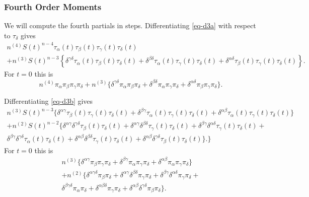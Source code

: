 \documentclass[
  12pt,
  letterpaper,
  DIV=11,
  numbers=noendperiod]{scrartcl}
\begin{document}
\subsubsection{Fourth Order Moments}\label{fourth-order-moments}

We will compute the fourth partials in steps. Differentiating
\eqref{eq-d3a} with respect to \(\tau_\delta\) gives \begin{multline}
n^{(4)}S(t)^{n-4}\tau_\alpha(t)\tau_\beta(t)\tau_\gamma(t)\tau_\delta(t)\\
+n^{(3)}S(t)^{n-3}\left\{\delta^{\gamma\delta}\tau_\alpha(t)\tau_\beta(t)\tau_\delta(t)+\delta^{\beta\delta}\tau_\alpha(t)\tau_\gamma(t)\tau_\delta(t)+\delta^{\alpha\delta}\tau_\beta(t)\tau_\gamma(t)\tau_\delta(t)\right\}.
\end{multline} For \(t=0\) this is \begin{equation}
n^{(4)}\pi_\alpha\pi_\beta\pi_\gamma\pi_\delta+n^{(3)}\{\delta^{\gamma\delta}\pi_\alpha\pi_\beta\pi_\delta+\delta^{\beta\delta}\pi_\alpha\pi_\gamma\pi_\delta+\delta^{\alpha\delta}\pi_\beta\pi_\gamma\pi_\delta\}.\label{eq-d4a}
\end{equation}

Differentiating \eqref{eq-d3b} gives \begin{multline}
n^{(3)}S(t)^{n-3}\{\delta^{\alpha\gamma}\tau_\beta(t)\tau_\gamma(t)\tau_\delta(t)+\delta^{\beta\gamma}\tau_\alpha(t)\tau_\gamma(t)\tau_\delta(t)+\delta^{\alpha\beta}\tau_\alpha(t)\tau_\gamma(t)\tau_\delta(t)\}\\
+n^{(2)}S(t)^{n-2}\{
\delta^{\alpha\gamma}\delta^{\gamma\delta}\tau_\beta(t)\tau_\delta(t)+
\delta^{\alpha\gamma}\delta^{\beta\delta}\tau_\gamma(t)\tau_\delta(t)+
\delta^{\beta\gamma}\delta^{\alpha\delta}\tau_\gamma(t)\tau_\delta(t)+\\
\delta^{\beta\gamma}\delta^{\gamma\delta}\tau_\alpha(t)\tau_\delta(t)+
\delta^{\alpha\beta}\delta^{\beta\delta}\tau_\gamma(t)\tau_\delta(t)+
\delta^{\alpha\beta}\delta^{\gamma\delta}\tau_\beta(t)\tau_\delta(t)\}.
\}
\end{multline} For \(t=0\) this is \begin{multline}
n^{(3)}\{\delta^{\alpha\gamma}\pi_\beta\pi_\gamma\pi_\delta+\delta^{\beta\gamma}\pi_\alpha\pi_\gamma\pi_\delta+\delta^{\alpha\beta}\pi_\alpha\pi_\gamma\pi_\delta\}\\
+n^{(2)}\{
\delta^{\alpha\gamma\delta}\pi_\beta\pi_\delta+
\delta^{\alpha\gamma}\delta^{\beta\delta}\pi_\gamma\pi_\delta+
\delta^{\beta\gamma}\delta^{\alpha\delta}\pi_\gamma\pi_\delta+\\
\delta^{\beta\gamma\delta}\pi_\alpha\pi_\delta+
\delta^{\alpha\beta\delta}\pi_\gamma\pi_\delta+
\delta^{\alpha\beta}\delta^{\gamma\delta}\pi_\beta\pi_\delta\}.\label{eq-d4b}
\end{multline}
\end{document}
